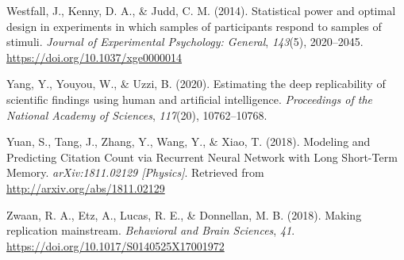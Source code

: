 \documentclass[
  english,
  jou,floatsintext]{apa6}
\newlength{\cslhangindent}
\newenvironment{cslreferences}%
  {\setlength{\parindent}{0pt}%
  \everypar{\setlength{\hangindent}{\cslhangindent}}\ignorespaces}%
  {\par}
\begin{document}
\begin{cslreferences}
\leavevmode\hypertarget{ref-Westfall2014}{}%
Westfall, J., Kenny, D. A., \& Judd, C. M. (2014). Statistical power and optimal design in experiments in which samples of participants respond to samples of stimuli. \emph{Journal of Experimental Psychology: General}, \emph{143}(5), 2020--2045. \url{https://doi.org/10.1037/xge0000014}

\leavevmode\hypertarget{ref-Yang2020}{}%
Yang, Y., Youyou, W., \& Uzzi, B. (2020). Estimating the deep replicability of scientific findings using human and artificial intelligence. \emph{Proceedings of the National Academy of Sciences}, \emph{117}(20), 10762--10768.

\leavevmode\hypertarget{ref-Yuan2018}{}%
Yuan, S., Tang, J., Zhang, Y., Wang, Y., \& Xiao, T. (2018). Modeling and Predicting Citation Count via Recurrent Neural Network with Long Short-Term Memory. \emph{arXiv:1811.02129 {[}Physics{]}}. Retrieved from \url{http://arxiv.org/abs/1811.02129}

\leavevmode\hypertarget{ref-Zwaan2018}{}%
Zwaan, R. A., Etz, A., Lucas, R. E., \& Donnellan, M. B. (2018). Making replication mainstream. \emph{Behavioral and Brain Sciences}, \emph{41}. \url{https://doi.org/10.1017/S0140525X17001972}
\end{cslreferences}
\end{document}
